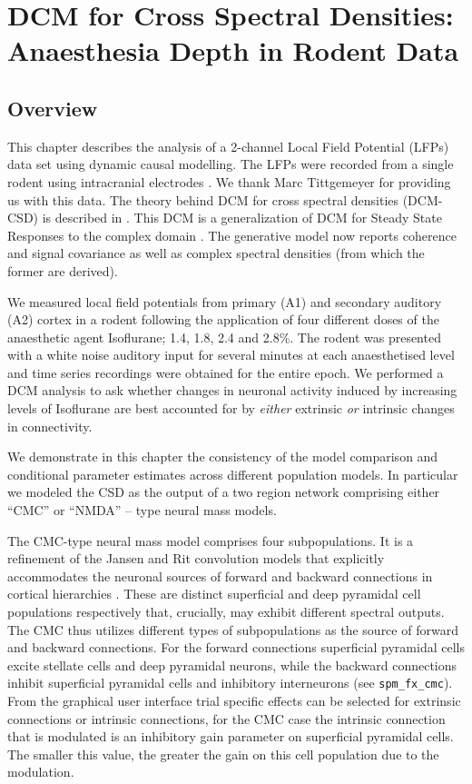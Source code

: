 \chapter{DCM for Cross Spectral Densities: Anaesthesia Depth in Rodent Data\label{Chap:data:dcm_csd}}

\section{Overview}

This chapter describes the analysis of a 2-channel Local Field Potential (LFPs) data set using dynamic causal modelling. The LFPs were recorded from a single rodent using intracranial electrodes \cite{dcm_ssr_anaesthesia}. We thank Marc Tittgemeyer for providing us with this data. The theory behind DCM for cross spectral densities (DCM-CSD) is described in \cite{Friston2012439}. This DCM is a generalization of DCM for Steady State Responses to the complex domain \cite{dcm_ssr}. The generative model now reports coherence and signal covariance as well as complex spectral densities (from which the former are derived).

We measured local field potentials from primary (A1) and secondary auditory (A2) cortex in a rodent following the application of four different doses of the anaesthetic agent Isoflurane; 1.4, 1.8, 2.4 and 2.8\%. The rodent was presented with a white noise auditory input for several minutes at each anaesthetised level and time series recordings were obtained for the entire epoch. We performed a DCM analysis to ask whether changes in neuronal activity induced by increasing levels of Isoflurane are best accounted for by \emph{either} extrinsic \emph{or} intrinsic changes in connectivity.

We demonstrate in this chapter the consistency of the model comparison and conditional parameter estimates across different population models. In particular we modeled the CSD as the output of a two region network comprising either ``CMC'' or ``NMDA'' -- type neural mass models.  


The CMC-type neural mass model comprises four subpopulations. It is a refinement of the Jansen and Rit convolution models that explicitly accommodates the neuronal sources of forward and backward connections in cortical hierarchies \cite{Bastos2012}. These are distinct superficial and deep pyramidal cell populations respectively that, crucially, may exhibit different spectral outputs. The CMC thus utilizes different types of subpopulations as the source of forward and backward connections. For the forward connections superficial pyramidal cells excite stellate cells and deep pyramidal neurons, while the backward connections inhibit superficial pyramidal cells and inhibitory interneurons (see \texttt{spm\_fx\_cmc}).  From the graphical user interface trial specific effects can be selected for extrinsic connections or intrinsic connections, for the CMC case the intrinsic connection that is modulated is an inhibitory gain parameter on superficial pyramidal cells. The smaller this value, the greater the gain on this cell population due to the modulation. 

